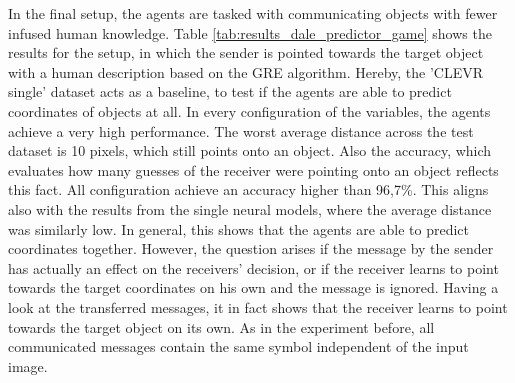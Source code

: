 In the final setup, the agents are tasked with communicating objects with fewer infused human knowledge.
Table \ref{tab:results_dale_predictor_game} shows the results for the setup, in which the sender is pointed towards the target object with a human description based on the GRE algorithm.
Hereby, the 'CLEVR single' dataset acts as a baseline, to test if the agents are able to predict coordinates of objects at all.
In every configuration of the variables, the agents achieve a very high performance.
The worst average distance across the test dataset is 10 pixels, which still points onto an object.
Also the accuracy, which evaluates how many guesses of the receiver were pointing onto an object reflects this fact.
All configuration achieve an accuracy higher than 96,7\%.
This aligns also with the results from the single neural models, where the average distance was similarly low.
In general, this shows that the agents are able to predict coordinates together.
However, the question arises if the message by the sender has actually an effect on the receivers' decision, or if the receiver learns to point towards the target coordinates on his own and the message is ignored.
Having a look at the transferred messages, it in fact shows that the receiver learns to point towards the target object on its own.
As in the experiment before, all communicated messages contain the same symbol independent of the input image.

